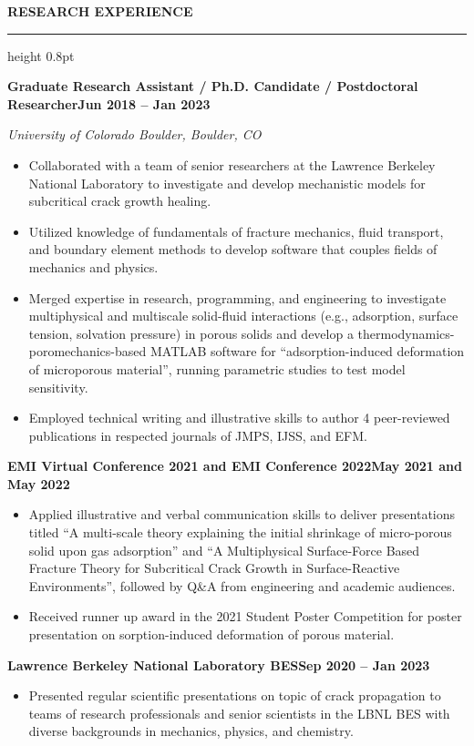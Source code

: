 \documentclass[10pt, letterpaper]{article}
\newcommand{\rsection}[1]{%
  \vspace{8pt}%
  {\large\bfseries\MakeUppercase{#1}}%
  \vspace{1pt}%
  \hrule height 0.8pt%
  \vspace{4pt}%
}
\newcommand{\jobline}[2]{%
  \vspace{5pt}%
  \noindent\textbf{#1}\hfill\textbf{#2}\par%
  \vspace{1pt}%
}
\newcommand{\subline}[1]{%
  \vspace{-1pt}%
  \noindent\textit{#1}\par%
  \vspace{1pt}%
}
\newenvironment{rlist}{%
  \begin{itemize}[leftmargin=1.4em, itemsep=1pt, topsep=2pt, parsep=0pt]%
}{%
  \end{itemize}%
}
\begin{document}
\rsection{Research Experience}

\jobline{Graduate Research Assistant / Ph.D. Candidate / Postdoctoral Researcher}{Jun 2018 -- Jan 2023}
\subline{University of Colorado Boulder, Boulder, CO}
\begin{rlist}
  \item Collaborated with a team of senior researchers at the Lawrence Berkeley National Laboratory to investigate and develop mechanistic models for subcritical crack growth healing.
  \item Utilized knowledge of fundamentals of fracture mechanics, fluid transport, and boundary element methods to develop software that couples fields of mechanics and physics.
  \item Merged expertise in research, programming, and engineering to investigate multiphysical and multiscale solid-fluid interactions (e.g., adsorption, surface tension, solvation pressure) in porous solids and develop a thermodynamics-poromechanics-based MATLAB software for ``adsorption-induced deformation of microporous material'', running parametric studies to test model sensitivity.
  \item Employed technical writing and illustrative skills to author 4 peer-reviewed publications in respected journals of JMPS, IJSS, and EFM.
\end{rlist}

\jobline{EMI Virtual Conference 2021 and EMI Conference 2022}{May 2021 and May 2022}
\begin{rlist}
  \item Applied illustrative and verbal communication skills to deliver presentations titled ``A multi-scale theory explaining the initial shrinkage of micro-porous solid upon gas adsorption'' and ``A Multiphysical Surface-Force Based Fracture Theory for Subcritical Crack Growth in Surface-Reactive Environments'', followed by Q\&A from engineering and academic audiences.
  \item Received runner up award in the 2021 Student Poster Competition for poster presentation on sorption-induced deformation of porous material.
\end{rlist}

\jobline{Lawrence Berkeley National Laboratory BES}{Sep 2020 -- Jan 2023}
\begin{rlist}
  \item Presented regular scientific presentations on topic of crack propagation to teams of research professionals and senior scientists in the LBNL BES with diverse backgrounds in mechanics, physics, and chemistry.
\end{rlist}
\end{document}
